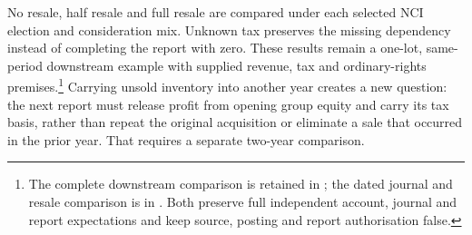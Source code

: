 No resale, half resale and full resale are compared under each selected NCI
election and consideration mix. Unknown tax preserves the missing dependency
instead of completing the report with zero. These results remain a one-lot,
same-period downstream example with supplied revenue, tax and ordinary-rights
premises.\footnote{The complete downstream comparison is retained in
; the dated
journal and resale comparison is in
.
Both preserve full independent account, journal and report expectations and
keep source, posting and report authorisation false.}
Carrying unsold inventory into another year creates a new question: the next
report must release profit from opening group equity and carry its tax basis,
rather than repeat the original acquisition or eliminate a sale that occurred
in the prior year. That requires a separate two-year comparison.
